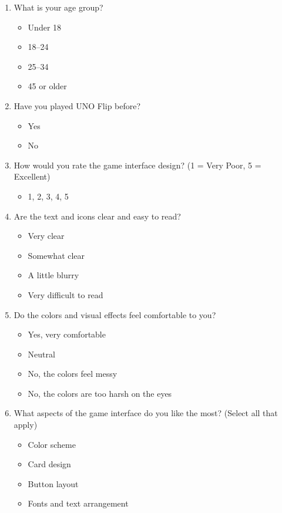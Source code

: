 \documentclass[12pt]{article}
\begin{document}
\begin{enumerate}
    \item What is your age group?
    \begin{itemize}
        \item Under 18
        \item 18–24
        \item 25–34
        \item 45 or older
    \end{itemize}

    \item Have you played UNO Flip before?
    \begin{itemize}
        \item Yes
        \item No
    \end{itemize}

    \item How would you rate the game interface design? (1 = Very Poor, 5 = Excellent)
    \begin{itemize}
        \item 1, 2, 3, 4, 5
    \end{itemize}

    \item Are the text and icons clear and easy to read?
    \begin{itemize}
        \item Very clear
        \item Somewhat clear
        \item A little blurry
        \item Very difficult to read
    \end{itemize}

    \item Do the colors and visual effects feel comfortable to you?
    \begin{itemize}
        \item Yes, very comfortable
        \item Neutral
        \item No, the colors feel messy
        \item No, the colors are too harsh on the eyes
    \end{itemize}

    \item What aspects of the game interface do you like the most? (Select all that apply)
    \begin{itemize}
        \item Color scheme
        \item Card design
        \item Button layout
        \item Fonts and text arrangement
    \end{itemize}


\end{enumerate}
\end{document}
